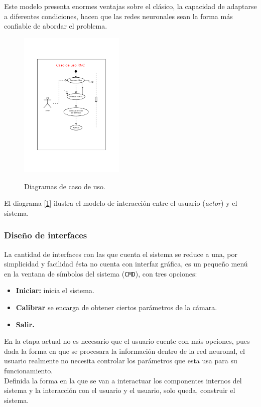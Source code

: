 \documentclass[12pt]{book} %
\begin{document}
			Este modelo presenta enormes ventajas sobre el clásico, la capacidad de adaptarse a diferentes condiciones, hacen que las redes neuronales sean
			la forma más confiable de abordar el problema.
			\begin{figure}[t]
				\centering
				\includegraphics[width=50mm]{./Diagramas/caso_uso_lenet.pdf} \label{f_uml_lenet}
				\caption{Diagramas de caso de uso. \label{f-lenete-uml}}
			\end{figure}	
			El diagrama [\ref{f-lenete-uml}] ilustra el modelo de interacción entre el usuario (\textit{actor}) y el sistema.
		
		\subsubsection{Diseño de interfaces}
			La cantidad de interfaces con las que cuenta el sistema se reduce a una, por simplicidad y facilidad ésta no cuenta con interfaz gráfica,
			es un pequeño menú en la ventana de símbolos del sistema (\texttt{CMD}), con tres opciones:
			\begin{itemize}
				\item \textbf{Iniciar:} inicia el sistema.
				\item \textbf{Calibrar} se encarga de obtener ciertos parámetros de la cámara.
				\item \textbf{Salir.}
			\end{itemize}
			En la etapa actual no es necesario que el usuario cuente con más opciones, pues dada la forma en que se procesara la información dentro 
			de la red neuronal, el usuario realmente no necesita controlar los parámetros que esta usa para su funcionamiento.\\
			
		Definida la forma en la que se van a interactuar los componentes internos del sistema y la interacción con el usuario y el usuario, solo queda, 
		construir el sistema.
		
\end{document}
